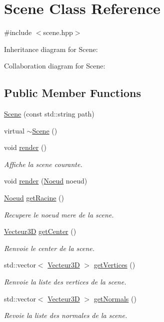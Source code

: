 \hypertarget{class_scene}{}\section{Scene Class Reference}
\label{class_scene}


{\ttfamily \#include $<$scene.\+hpp$>$}



Inheritance diagram for Scene\+:


Collaboration diagram for Scene\+:
\subsection*{Public Member Functions}
\begin{DoxyCompactItemize}
\item 
\hyperlink{class_scene_af761cd03640e306bc55afa79093e334d}{Scene} (const std\+::string path)
\item 
virtual \hyperlink{class_scene_a3b8cec2e32546713915f8c6303c951f1}{$\sim$\+Scene} ()
\item 
void \hyperlink{class_scene_a4ddf2d16f371ee9533b3faf1dd5ddfb1}{render} ()
\begin{DoxyCompactList}\small\item\em Affiche la scene courante. \end{DoxyCompactList}\item 
void \hyperlink{class_scene_af0747116905b9098ba3bd2c9d4b67162}{render} (\hyperlink{class_noeud}{Noeud} noeud)
\item 
\hyperlink{class_noeud}{Noeud} \hyperlink{class_scene_a6d9239ca059ca24b0a767aebc1c9a63b}{get\+Racine} ()
\begin{DoxyCompactList}\small\item\em Recupere le noeud mere de la scene. \end{DoxyCompactList}\item 
\hyperlink{class_vecteur3_d}{Vecteur3D} \hyperlink{class_scene_ada5afef61a8061abb6d3dfb38802f551}{get\+Center} ()
\begin{DoxyCompactList}\small\item\em Renvoie le center de la scene. \end{DoxyCompactList}\item 
std\+::vector$<$ \hyperlink{class_vecteur3_d}{Vecteur3D} $>$ \hyperlink{class_scene_a899e0ef799504383505743ebecc58406}{get\+Vertices} ()
\begin{DoxyCompactList}\small\item\em Renvoie la liste des vertices de la scene. \end{DoxyCompactList}\item 
std\+::vector$<$ \hyperlink{class_vecteur3_d}{Vecteur3D} $>$ \hyperlink{class_scene_a98442b4ed5ff289a695d9a6eea7b6ebd}{get\+Normals} ()
\begin{DoxyCompactList}\small\item\em Revoie la liste des normales de la scene. \end{DoxyCompactList}\end{DoxyCompactItemize}


